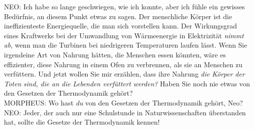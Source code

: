 {\begin{playdialog}
NEO: Ich habe so lange geschwiegen, wie ich konnte, aber ich fühle ein gewisses Bedürfnis, an diesem Punkt etwas zu sagen. Der menschliche Körper ist die ineffizienteste Energiequelle, die man sich vorstellen kann. Der Wirkungsgrad eines Kraftwerks bei der Umwandlung von Wärmeenergie in Elektrizität \emph{nimmt ab}, wenn man die Turbinen bei niedrigeren Temperaturen laufen lässt. Wenn Sie irgendeine Art von Nahrung hätten, die Menschen essen könnten, wäre es effizienter, diese Nahrung in einem Ofen zu verbrennen, als sie an Menschen zu verfüttern. Und jetzt wollen Sie mir erzählen, dass ihre Nahrung \emph{die Körper der Toten} \emph{sind, die an die Lebenden verfüttert werden?} Haben Sie noch nie etwas von den Gesetzen der Thermodynamik gehört?\\

MORPHEUS: Wo hast \emph{du} von den Gesetzen der Thermodynamik gehört, Neo?\\

NEO: Jeder, der auch nur eine Schulstunde in Naturwissenschaften überstanden hat, sollte die Gesetze der Thermodynamik kennen!\\


\end{playdialog}}
